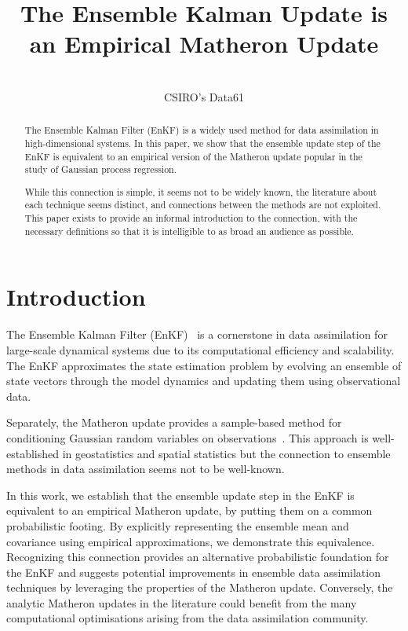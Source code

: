 \documentclass[wcp]{jmlr} %
\title[Ensemble Kalman Update]{The Ensemble Kalman Update is an Empirical Matheron Update}
\author{\Name{Dan MacKinlay\thanks{\href{https://orcid.org/0000-0001-6077-2684}{ORCID: 0000-0001-6077-2684}}}\\
  \addr CSIRO's Data61}
\begin{document}
\maketitle

\begin{abstract}
The Ensemble Kalman Filter (EnKF) is a widely used method for data assimilation in high-dimensional systems.
In this paper, we show that the ensemble update step of the EnKF is equivalent to an empirical version of the Matheron update popular in the study of Gaussian process regression.

While this connection is simple, it seems not to be widely known, the literature about each technique seems distinct, and connections between the methods are not exploited.
This paper exists to provide an informal introduction to the connection, with the necessary definitions so that it is intelligible to as broad an audience as possible.
\end{abstract}

\section{Introduction}
The Ensemble Kalman Filter (EnKF)~\citep{Evensen2003Ensemble,Evensen2009Data} is a cornerstone in data assimilation for large-scale dynamical systems due to its computational efficiency and scalability.
The EnKF approximates the state estimation problem by evolving an ensemble of state vectors through the model dynamics and updating them using observational data.

Separately, the Matheron update provides a sample-based method for conditioning Gaussian random variables on observations~\citep{Doucet2010Note,Wilson2020Efficiently,Wilson2021Pathwise}.
This approach is well-established in geostatistics and spatial statistics but the connection to ensemble methods in data assimilation seems not to be well-known.

In this work, we establish that the ensemble update step in the EnKF is equivalent to an empirical Matheron update, by putting them on a common probabilistic footing.
By explicitly representing the ensemble mean and covariance using empirical approximations, we demonstrate this equivalence.
Recognizing this connection provides an alternative probabilistic foundation for the EnKF and suggests potential improvements in ensemble data assimilation techniques by leveraging the properties of the Matheron update.
Conversely, the analytic Matheron updates in the literature could benefit from the many computational optimisations arising from the data assimilation community.
\end{document}
